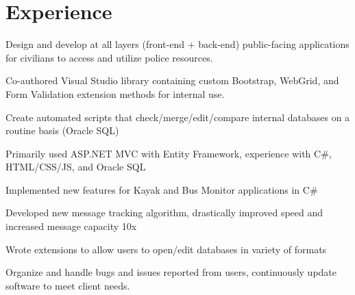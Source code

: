 \documentclass[letterpaper]{deedy-resume} %
\begin{document}
\begin{minipage}[t]{0.66\textwidth} %


\section{Experience}


\vspace{\topsep} %
\begin{tightemize}
\item Design and develop at all layers (front-end + back-end) public-facing applications for civilians to access and utilize police resources.  
\item Co-authored Visual Studio library containing custom Bootstrap, WebGrid, and Form Validation extension methods for internal use.
\item Create automated scripts that check/merge/edit/compare internal databases on a routine basis (Oracle SQL)
\item Primarily used ASP.NET MVC with Entity Framework, experience with C\#, HTML/CSS/JS, and Oracle SQL
\end{tightemize}

\sectionsep %


\begin{tightemize}
\item Implemented new features for Kayak and Bus Monitor applications in C\#
\item Developed new message tracking algorithm, drastically improved speed and increased message capacity 10x 
\item Wrote extensions to allow users to open/edit databases in variety of formats
\item Organize and handle bugs and issues reported from users, continuously update software to meet client needs.
\end{tightemize}


\end{minipage}
\end{document}
